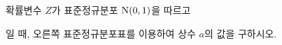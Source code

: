 \noindent\begin{minipage}[t]{0.58\linewidth}\vspace{0pt}\raggedright 확률변수 $Z$가 표준정규분포 $\mathrm{N}(0{,}\mkern3mu\mathopen{}1)$을 따르고\par\smallskip\end{minipage}\hfill\begin{minipage}[t]{0.4\linewidth}\vspace{0pt}\centering \resizebox{\ifdim\width>\linewidth\linewidth\else\width\fi}{!}{}\end{minipage}\par
\noindent {}\par\smallskip\noindent 일 때, 오른쪽 표준정규분포표를 이용하여 상수 $a$의 값을 구하시오.
